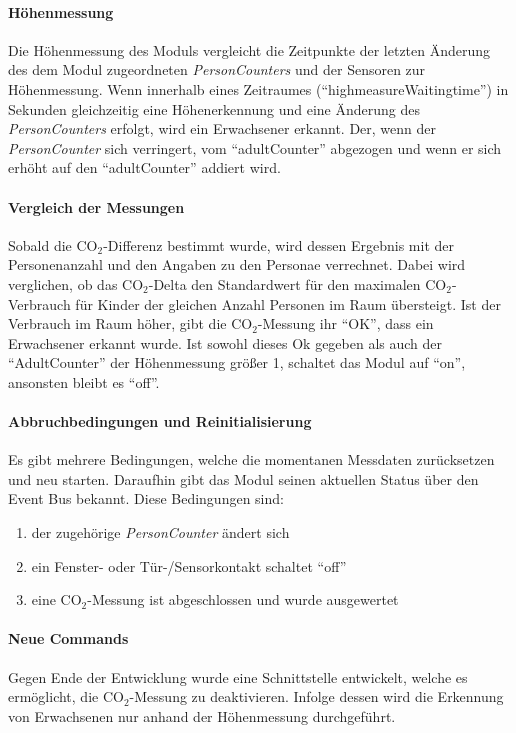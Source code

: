 \paragraph{Höhenmessung}
Die Höhenmessung des Moduls vergleicht die Zeitpunkte der letzten Änderung des dem Modul zugeordneten \emph{PersonCounters} und der Sensoren zur Höhenmessung. Wenn innerhalb eines Zeitraumes ("`highmeasureWaitingtime"') in Sekunden gleichzeitig eine Höhenerkennung und eine Änderung des \emph{PersonCounters} erfolgt, wird ein Erwachsener erkannt. Der, wenn der \emph{PersonCounter} sich verringert, vom "`adultCounter"' abgezogen und wenn er sich erhöht auf den "`adultCounter"' addiert wird.

\paragraph{Vergleich der Messungen}
Sobald die CO$_2$-Differenz bestimmt wurde, wird dessen Ergebnis mit der Personenanzahl und den Angaben zu den Personae verrechnet. Dabei wird verglichen, ob das CO$_2$-Delta den Standardwert für den maximalen CO$_2$-Verbrauch für Kinder der gleichen Anzahl Personen im Raum übersteigt. Ist der Verbrauch im Raum höher, gibt die CO$_2$-Messung ihr "`OK"', dass ein Erwachsener erkannt wurde. Ist sowohl dieses Ok gegeben als auch der "`AdultCounter"' der Höhenmessung größer 1, schaltet das Modul auf "`on"', ansonsten bleibt es "`off"'.

\paragraph{Abbruchbedingungen und Reinitialisierung}
Es gibt mehrere Bedingungen, welche die momentanen Messdaten zurücksetzen und neu starten. Daraufhin gibt das Modul seinen aktuellen Status über den Event Bus bekannt. Diese Bedingungen sind:
\begin{enumerate}
	\item der zugehörige \emph{PersonCounter} ändert sich
	\item ein Fenster- oder Tür-/Sensorkontakt schaltet "`off"'
	\item eine CO$_2$-Messung ist abgeschlossen und wurde ausgewertet
\end{enumerate}

\paragraph{Neue Commands}
Gegen Ende der Entwicklung wurde eine Schnittstelle entwickelt, welche es ermöglicht, die CO$_2$-Messung zu deaktivieren. Infolge dessen wird die Erkennung von Erwachsenen nur anhand der Höhenmessung durchgeführt.

